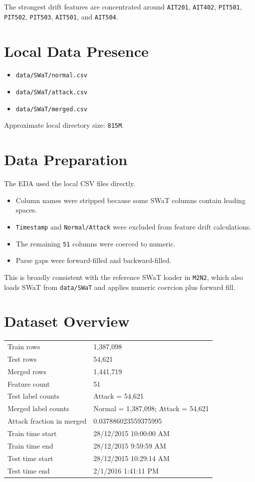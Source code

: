 \documentclass[11pt]{article}
\begin{document}
The strongest drift features are concentrated around \texttt{AIT201}, \texttt{AIT402}, \texttt{PIT501}, \texttt{PIT502}, \texttt{PIT503}, \texttt{AIT501}, and \texttt{AIT504}.

\section*{Local Data Presence}
\begin{itemize}
\item \texttt{data/SWaT/normal.csv}
\item \texttt{data/SWaT/attack.csv}
\item \texttt{data/SWaT/merged.csv}
\end{itemize}

Approximate local directory size: \texttt{815M}.

\section*{Data Preparation}
The EDA used the local CSV files directly.
\begin{itemize}
\item Column names were stripped because some SWaT columns contain leading spaces.
\item \texttt{Timestamp} and \texttt{Normal/Attack} were excluded from feature drift calculations.
\item The remaining \texttt{51} columns were coerced to numeric.
\item Parse gaps were forward-filled and backward-filled.
\end{itemize}

This is broadly consistent with the reference SWaT loader in \texttt{M2N2}, which also loads SWaT from \texttt{data/SWaT} and applies numeric coercion plus forward fill.

\section*{Dataset Overview}
\begin{longtable}{@{}ll@{}}
\toprule
Train rows & 1,387,098 \\
Test rows & 54,621 \\
Merged rows & 1,441,719 \\
Feature count & 51 \\
Test label counts & Attack = 54,621 \\
Merged label counts & Normal = 1,387,098; Attack = 54,621 \\
Attack fraction in merged & 0.037886023559375995 \\
Train time start & 28/12/2015 10:00:00 AM \\
Train time end & 28/12/2015 9:59:59 AM \\
Test time start & 28/12/2015 10:29:14 AM \\
Test time end & 2/1/2016 1:41:11 PM \\
\bottomrule
\end{longtable}
\end{document}
